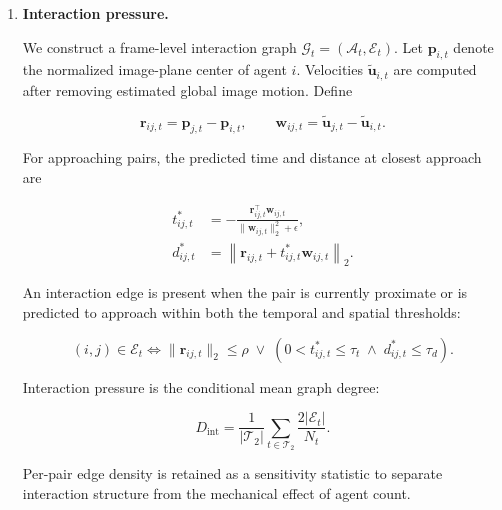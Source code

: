 \begin{enumerate}
where \(e_{i,t}\) indicates boundary truncation and \(g_{i,t}\)
indicates an interior track gap followed by reappearance within the
prespecified temporal window. Visibility pressure is

\[
D_{\mathrm{vis}}
=
\frac{1}{|\mathcal T_1|}
\sum_{t\in\mathcal T_1}
\frac{
\sum_{i\in\mathcal A_t}z_{i,t}
}{
N_t
}.
\]

Overlap, boundary-truncation, and track-gap rates are also examined
separately to verify that the composite is not dominated by one proxy.

\item \textbf{Interaction pressure.}

We construct a frame-level interaction graph
\(\mathcal G_t=(\mathcal A_t,\mathcal E_t)\). Let
\(\mathbf p_{i,t}\) denote the normalized image-plane center of agent
\(i\). Velocities \(\widetilde{\mathbf u}_{i,t}\) are computed after
removing estimated global image motion. Define

\[
\mathbf r_{ij,t}
=
\mathbf p_{j,t}-\mathbf p_{i,t},
\qquad
\mathbf w_{ij,t}
=
\widetilde{\mathbf u}_{j,t}
-
\widetilde{\mathbf u}_{i,t}.
\]

For approaching pairs, the predicted time and distance at closest
approach are

\begin{equation*}
\begin{aligned}
t_{ij,t}^{*}
&=
-\frac{
\mathbf r_{ij,t}^{\top}\mathbf w_{ij,t}
}{
\|\mathbf w_{ij,t}\|_2^2+\epsilon
},
\\
d_{ij,t}^{*}
&=
\left\|
\mathbf r_{ij,t}
+
t_{ij,t}^{*}\mathbf w_{ij,t}
\right\|_2 .
\end{aligned}
\end{equation*}

An interaction edge is present when the pair is currently proximate or
is predicted to approach within both the temporal and spatial
thresholds:

\[
(i,j)\in\mathcal E_t
\iff
\|\mathbf r_{ij,t}\|_2\le\rho
\;\lor\;
\left(
0<t_{ij,t}^{*}\le\tau_t
\;\land\;
d_{ij,t}^{*}\le\tau_d
\right).
\]

Interaction pressure is the conditional mean graph degree:

\[
D_{\mathrm{int}}
=
\frac{1}{|\mathcal T_2|}
\sum_{t\in\mathcal T_2}
\frac{2|\mathcal E_t|}{N_t}.
\]

Per-pair edge density is retained as a sensitivity statistic to
separate interaction structure from the mechanical effect of agent
count.


\end{enumerate}

